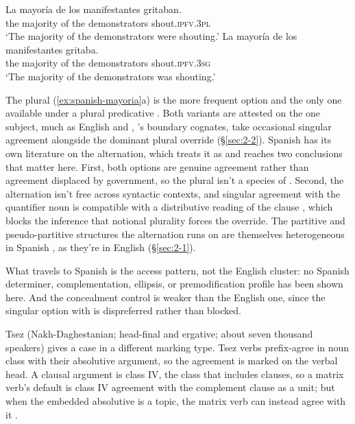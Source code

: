 \ea\label{ex:spanish-mayoria}
\ea \gll La mayoría de los manifestantes gritaban. \\
the majority of the demonstrators shout.\textsc{ipfv.3pl} \\
\glt `The majority of the demonstrators were shouting.'
\ex \gll La mayoría de los manifestantes gritaba. \\
the majority of the demonstrators shout.\textsc{ipfv.3sg} \\
\glt `The majority of the demonstrators was shouting.'
\z
\z

The plural (\ref{ex:spanish-mayoria}a) is the more frequent option and the only one available under a plural predicative \autocite{rae-concordancia-mayoria}. Both variants are attested on the one subject, much as English  and , 's boundary cognates, take occasional singular agreement alongside the dominant plural override (§\ref{sec:2-2}). Spanish has its own literature on the alternation, which treats it as  and reaches two conclusions that matter here. First, both options are genuine agreement rather than agreement displaced by government, so the plural isn't a species of  \autocite{sanjulian2018-cuantificadores}. Second, the alternation isn't free across syntactic contexts, and singular agreement with the quantifier noun is compatible with a distributive reading of the clause \autocite{sanjulian2018-cuantificadores}, which blocks the inference that notional plurality forces the override. The partitive and pseudo-partitive structures the alternation runs on are themselves heterogeneous in Spanish \autocite{sanjulian2018-pseudopartitivas}, as they're in English (§\ref{sec:2-1}).

What travels to Spanish is the access pattern, not the English cluster: no Spanish determiner, complementation, ellipsis, or premodification profile has been shown here. And the concealment control is weaker than the English one, since the singular option with  is dispreferred rather than blocked.

Tsez (Nakh-Daghestanian; head-final and ergative; about seven thousand speakers) gives a case in a different marking type. Tsez verbs prefix-agree in noun class with their absolutive argument, so the agreement is marked on the verbal head. A clausal argument is class IV, the class that includes clauses, so a matrix verb's default is class IV agreement with the complement clause as a unit; but when the embedded absolutive is a topic, the matrix verb can instead agree with it \autocite[436]{potsdam-polinsky-1999}.

